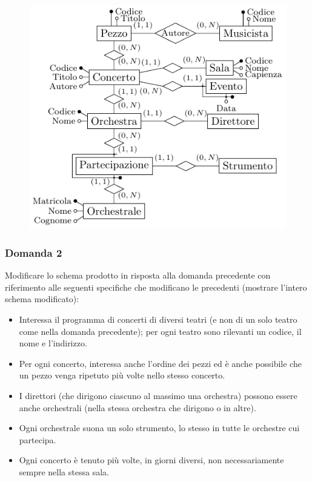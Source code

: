 \documentclass{article}
\begin{document}
\begin{figure}[H]%
    \centering
    \includegraphics[scale=1.25]{schema_er_es_3.pdf}%
\end{figure}

\subsubsection*{Domanda 2}

Modificare lo schema prodotto in risposta alla domanda precedente con riferimento alle seguenti specifiche che modificano le precedenti 
(mostrare l'intero schema modificato):
\begin{itemize}
    \item Interessa il programma di concerti di diversi teatri (e non di un solo teatro come nella domanda precedente); per ogni teatro sono rilevanti un codice, il nome e l'indirizzo. 
    \item Per ogni concerto, interessa anche l'ordine dei pezzi ed è anche possibile che un pezzo venga ripetuto più volte nello stesso concerto. 
    \item I direttori (che dirigono ciascuno al massimo una orchestra) possono essere anche orchestrali (nella stessa orchestra che dirigono o in altre). 
    \item Ogni orchestrale suona un solo strumento, lo stesso in tutte le orchestre cui partecipa.
    \item Ogni concerto è tenuto più volte, in giorni diversi, non necessariamente sempre nella stessa sala. 
\end{itemize}
\end{document}
